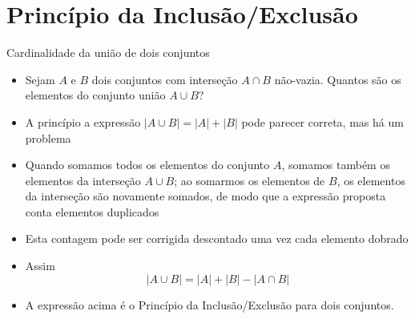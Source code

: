 \section*{Princípio da Inclusão/Exclusão}

\begin{frame}[fragile]{Cardinalidade da união de dois conjuntos}

    \begin{itemize}
        \item Sejam $A$ e $B$ dois conjuntos com interseção $A\cap B$ não-vazia. Quantos são os elementos do 
    conjunto união $A\cup B$?

        \item A princípio a expressão $|A\cup B| = |A| + |B|$ pode parecer correta, mas há um problema

        \item Quando somamos todos os elementos do conjunto $A$, somamos também os elementos da interseção $A\cup B$; ao somarmos os elementos de $B$, os elementos da interseção são novamente somados, de modo que a expressão proposta conta elementos duplicados

        \item Esta contagem pode ser corrigida descontado uma vez cada elemento dobrado

        \item Assim
        \[
            | A \cup B | = | A | + | B | - | A \cap B |
        \]

        \item A expressão acima é o Princípio da Inclusão/Exclusão para dois conjuntos.
    \end{itemize}

\end{frame}


